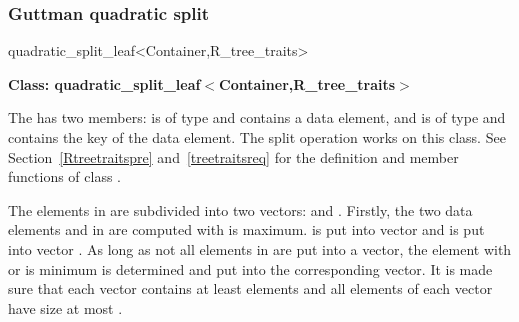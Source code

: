 \subsubsection{Guttman quadratic split}

\begin{ccClassTemplate}{quadratic_split_leaf<Container,R_tree_traits>}

\noindent
{\bf Class: quadratic\_split\_leaf$<$Container,R\_tree\_traits$>$}

\ccDefinition

The  has two members:  is of
type  and contains a data element, and  is of
type  and contains the key of the data element.
The split operation works
on this class. 
See Section~\ref{Rtreetraitspre} and~\ref{treetraitsreq} for the definition and member
functions of class .

\ccCreation
{}


\ccOperations
{}
{The  elements in  are
  subdivided into two vectors:  and
  . Firstly, the two data elements  and 
  in  are computed with  is
  maximum.  is put into vector  and  is
  put into vector . As long as not all elements in
   are put into a vector, the element  with 
 or  is
  minimum is determined and put into the corresponding vector. It
  is made sure that each vector contains at least
   elements and all  elements of each
  vector have size 
  at most .}

\end{ccClassTemplate}

